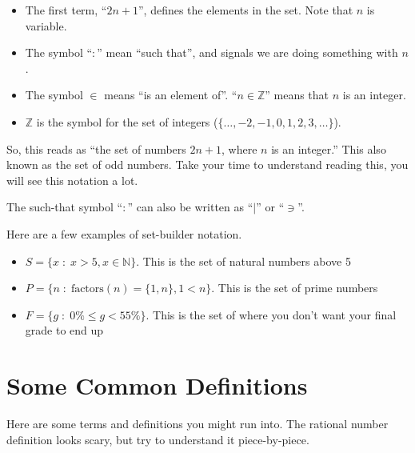 \begin{itemize}
	\item The first term, ``$2n+1$'', defines the elements in the set. Note that $n$ is variable.
	\item The symbol ``$:$'' mean ``such that'', and signals we are doing something with $n$.
	\item The symbol $\in$ means ``is an element of''. ``$n \in \mathbb{Z}$'' means that $n$ is an integer.
	\item $\mathbb{Z}$ is the symbol for the set of integers ($\{\dots,-2,-1,0,1,2,3,\dots\}$).
\end{itemize}

So, this reads as ``the set of numbers $2n+1$, where $n$ is an integer.'' This also known as the set of odd numbers. Take your time to understand reading this, you will see this notation a lot.

\begin{boxnotation*}{}{}
	The such-that symbol ``$:$'' can also be written as ``$|$'' or ``$\ni$''.
\end{boxnotation*}

\begin{boxexample}{}{}
	Here are a few examples of set-builder notation.

	\begin{itemize}
		\item $S = \{x \;:\; x > 5, x \in \mathbb{N}\}$. This is the set of natural numbers above 5
		\item $P = \{n \;:\; \text{factors}(n) = \{1,n\}, 1 < n\}$. This is the set of prime numbers
		\item $F = \{g \;:\; 0\% \leq g < 55\%\}$. This is the set of where you don't want your final grade to end up
	\end{itemize}
\end{boxexample}
	
\section{Some Common Definitions}

Here are some terms and definitions you might run into. The rational number definition looks scary, but try to understand it piece-by-piece.

